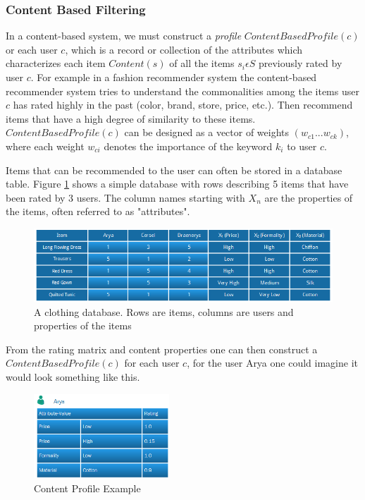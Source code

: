 \subsubsection{Content Based Filtering}

In a content-based system, we must construct a \emph{profile}
$ContentBasedProfile(c)$ or each user $c$, which is a record or collection of
the attributes which characterizes each item $Content(s)$ of all the items
$s_{i} \epsilon S$ previously rated by user $c$. For example in a fashion
recommender system the content-based recommender system tries to understand the
commonalities among the items user $c$ has rated highly in the past (color,
brand, store, price, etc.). Then recommend items that have a high degree of
similarity to these items. $ContentBasedProfile(c)$ can be designed as a vector
of weights $(w_{c1} ... w_{ck})$, where each weight $w_{ci}$ denotes the
importance of the keyword $k_{i}$ to user $c$.

Items that can be recommended to the user can often be stored in a database
table. Figure \ref{figure:contentbaseddb} shows a simple database with rows
describing 5 items that have been rated by 3 users. The column names starting
with $X_{n}$ are the properties of the items, often referred to as
"attributes".

\begin{figure}[H]
    \includegraphics[width=5in]{image/contentbaseddb.png}
    \centering
    \caption[A clothing database]{A clothing database. Rows are items, columns
    are users and properties of the items}
    \label{figure:contentbaseddb}
\end{figure}

From the rating matrix and content properties one can then construct a
$ContentBasedProfile(c)$ for each user $c$, for the user Arya one could imagine
it would look something like this.

\begin{figure}[H]
    \includegraphics[width=2in]{image/contentprofile.png}
    \centering
    \caption[Content Profile Example]{Content Profile Example}
    \label{figure:contentprofile}
\end{figure}

